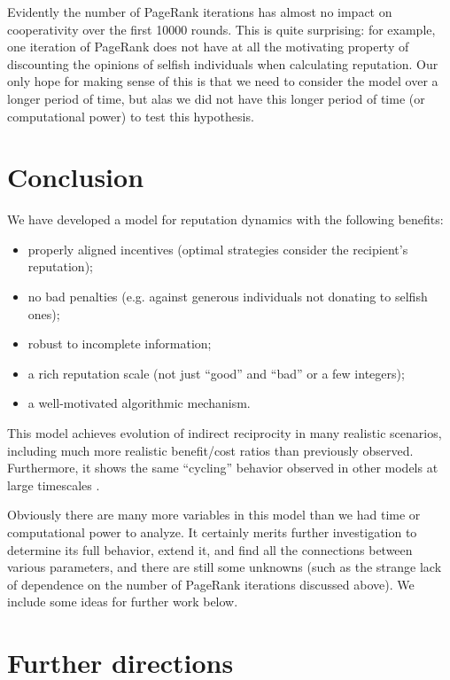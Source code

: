 \documentclass{amsart}
\begin{document}
Evidently the number of PageRank iterations has almost no impact on
cooperativity over the first 10000 rounds. This is quite surprising:
for example, one iteration of PageRank does not have at all the
motivating property of discounting the opinions of selfish individuals
when calculating reputation. Our only hope for making sense of this is
that we need to consider the model over a longer period of time, but
alas we did not have this longer period of time (or computational
power) to test this hypothesis.


\section{Conclusion}
\label{section-conclusion}

We have developed a model for reputation dynamics with the following
benefits:

\begin{itemize}
\item properly aligned incentives (optimal strategies consider the
  recipient's reputation);
\item no bad penalties (e.g. against generous individuals not donating
  to selfish ones);
\item robust to incomplete information;
\item a rich reputation scale (not just ``good'' and ``bad'' or a few
  integers);
\item a well-motivated algorithmic mechanism.
\end{itemize}

This model achieves evolution of indirect reciprocity in many
realistic scenarios, including much more realistic benefit/cost ratios
than previously observed. Furthermore, it shows the same ``cycling''
behavior observed in other models at large timescales
\cite{nowak_evolution_1998}.

Obviously there are many more variables in this model than we had time
or computational power to analyze. It certainly merits further
investigation to determine its full behavior, extend it, and find all
the connections between various parameters, and there are still some
unknowns (such as the strange lack of dependence on the number of
PageRank iterations discussed above). We include some ideas for
further work below.

\section{Further directions}
\label{section-further}
\end{document}
